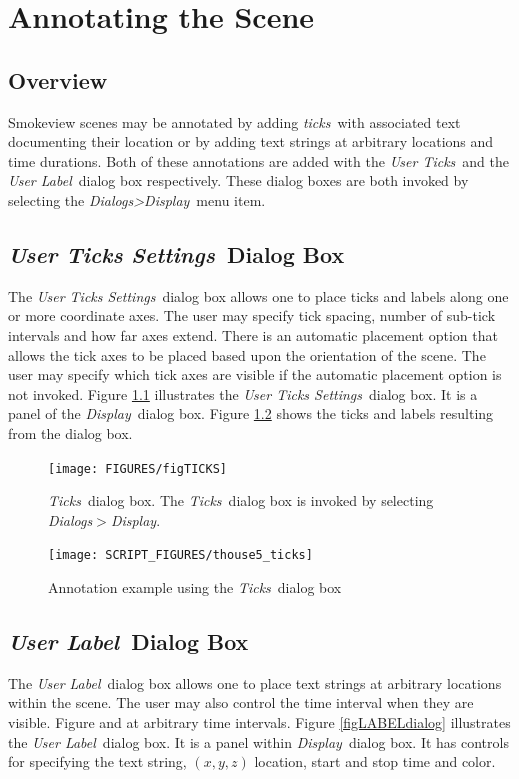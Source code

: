 \documentclass[11pt,twoside]{book}
\begin{document}
\chapter{Annotating the Scene }
\label{section:annotate} \label{subsect_features}
\section{Overview}
Smokeview scenes may be annotated by adding {\em ticks}\ with associated
text documenting their location
or by adding text strings at arbitrary locations and time durations.
Both of these annotations
are added with the {\em User Ticks}\ and the {\em User Label}\ dialog
box respectively.  These dialog boxes are both invoked by selecting the
{\em Dialogs>Display}\ menu item.

\section{{\em User Ticks Settings}\ Dialog Box}
The {\em User Ticks Settings}\ dialog box allows one to place
ticks and labels along one or more coordinate axes. The
user may specify tick spacing, number of sub-tick intervals and
how far axes extend.  There is an automatic placement option that
allows the tick axes to be placed based upon the orientation of
the scene.  The user may specify which tick axes are visible if
the automatic placement option is not invoked.  Figure
\ref{figTICKSdialog} illustrates the {\em User Ticks Settings}\
dialog box.  It is a panel of the {\em Display}\ dialog box.
Figure \ref{figTICKSdialogexample} shows the ticks and labels
resulting from the dialog box.

\begin{figure}[\figoptions]
\centerline{
\texttt{[image: FIGURES/figTICKS]}
} \caption[{\em Ticks}\ dialog box.]{{\em Ticks}\ dialog box. The
{\em Ticks}\ dialog box is invoked by selecting {\em
Dialogs$>$Display}. } \label{figTICKSdialog}
\end{figure}

\begin{figure}[\figoptions]
\begin{center}
\texttt{[image: SCRIPT\_FIGURES/thouse5\_ticks]}
\end{center}
\caption{Annotation example using the {\em Ticks}\ dialog box}
\label{figTICKSdialogexample}%
\end{figure}

\section{{\em User Label}\ Dialog Box}
The {\em User Label}\ dialog box allows one to place
text strings at arbitrary locations within the scene.  The user may also
control the time interval when they are visible.  Figure  and at arbitrary time intervals.
Figure \ref{figLABELdialog} illustrates the {\em User Label}\
dialog box.  It is a panel within {\em Display}\ dialog box.
It has controls for specifying the text string, $(x,y,z)$ location,
start and stop time and color.
\end{document}
